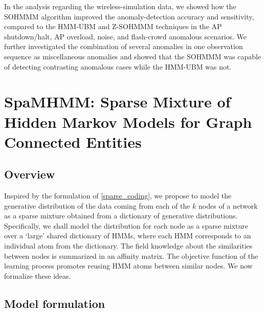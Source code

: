 In the analysis regarding the wireless-simulation data, we showed how the SOHMMM algorithm improved the anomaly-detection accuracy and sensitivity, compared to the HMM-UBM and Z-SOHMMM techniques in the AP shutdown/halt, AP overload, noise, and flash-crowd anomalous scenarios. We further investigated the combination of several anomalies in one observation sequence as miscellaneous anomalies and showed that the SOHMMM was capable of detecting contrasting anomalous cases while the HMM-UBM was not. 

\section{SpaMHMM: Sparse Mixture of Hidden Markov Models for Graph Connected Entities}
\label{sec:spamhmm}

\subsection{Overview}

Inspired by the formulation of \eqref{sparse_coding}, we propose to model the generative distribution of the data coming from each of the $k$ nodes of a network as a sparse mixture obtained from a dictionary of generative distributions. Specifically, we shall model the distribution for each node as a sparse mixture over a `large' shared dictionary of HMMs, where each HMM corresponds to an individual atom from the dictionary.
The field knowledge about the similarities between nodes is summarized in an affinity matrix. The objective function of the learning process promotes reusing HMM atoms between similar nodes.
We now formalize these ideas.

\subsection{Model formulation}
